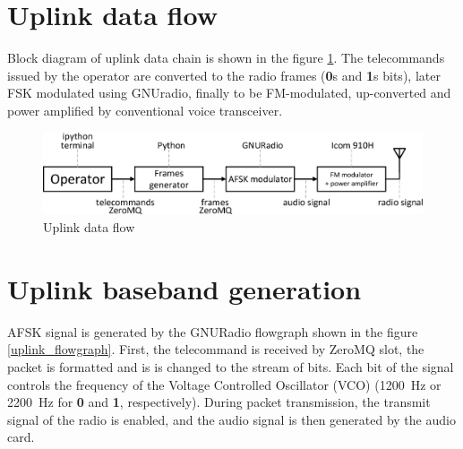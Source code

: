 
\newpage

\section{Uplink data flow}
Block diagram of uplink data chain is shown in the figure \ref{uplink_data_flow}. The telecommands issued by the operator are converted to the radio frames (\textbf{0}s and \textbf{1}s bits), later FSK modulated using GNUradio, finally to be FM-modulated, up-converted and power amplified by conventional voice transceiver.

\begin{figure}[H]
    \centering
    \includegraphics[width=0.6\paperwidth]{img/7/uplink_data_flow.eps}
    \caption{Uplink data flow}
    \label{uplink_data_flow}
\end{figure}

\section{Uplink baseband generation}
AFSK signal is generated by the GNURadio flowgraph shown in the figure \ref{uplink_flowgraph}. First, the telecommand is received by ZeroMQ slot, the packet is formatted and is is changed to the stream of bits. Each bit of the signal controls the frequency of the Voltage Controlled Oscillator (VCO) (\SI{1200}{\hertz} or \SI{2200}{\hertz} for \textbf{0} and \textbf{1}, respectively). During packet transmission, the transmit signal of the radio is enabled, and the audio signal is then generated by the audio card.

